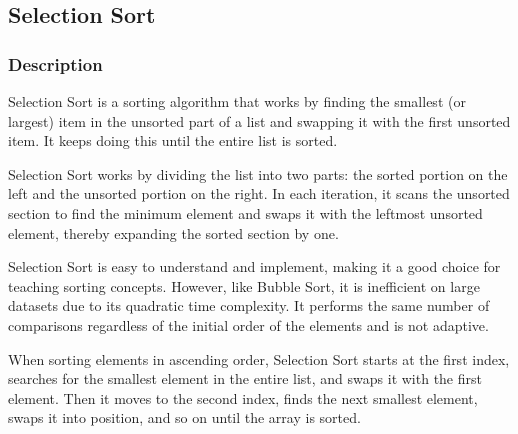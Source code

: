 \subsection{Selection Sort}

\subsubsection{Description}

Selection Sort is a sorting algorithm that works by finding the smallest (or largest) item in the unsorted part of a list and swapping it with the first unsorted item. It keeps doing this until the entire list is sorted.

Selection Sort works by dividing the list into two parts: the sorted portion on the left and the unsorted portion on the right. In each iteration, it scans the unsorted section to find the minimum element and swaps it with the leftmost unsorted element, thereby expanding the sorted section by one.

Selection Sort is easy to understand and implement, making it a good choice for teaching sorting concepts. However, like Bubble Sort, it is inefficient on large datasets due to its quadratic time complexity. It performs the same number of comparisons regardless of the initial order of the elements and is not adaptive.

When sorting elements in ascending order, Selection Sort starts at the first index, searches for the smallest element in the entire list, and swaps it with the first element. Then it moves to the second index, finds the next smallest element, swaps it into position, and so on until the array is sorted. 

